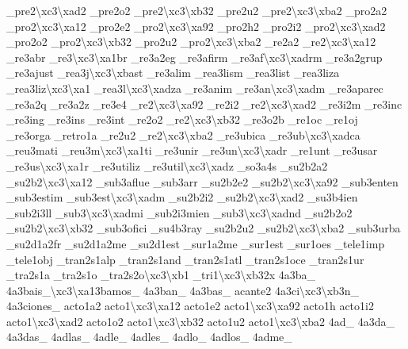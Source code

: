 {\-\_\-pre2\textbackslash{}xc3\textbackslash{}xad2 \-\_\-pre2o2 \-\_\-pre2\textbackslash{}xc3\textbackslash{}xb32 \-\_\-pre2u2 \-\_\-pre2\textbackslash{}xc3\textbackslash{}xba2 \-\_\-pro2a2 \-\_\-pro2\textbackslash{}xc3\textbackslash{}xa12 \-\_\-pro2e2 \-\_\-pro2\textbackslash{}xc3\textbackslash{}xa92 \-\_\-pro2h2 \-\_\-pro2i2 \-\_\-pro2\textbackslash{}xc3\textbackslash{}xad2 \-\_\-pro2o2 \-\_\-pro2\textbackslash{}xc3\textbackslash{}xb32 \-\_\-pro2u2 \-\_\-pro2\textbackslash{}xc3\textbackslash{}xba2 \-\_\-re2a2 \-\_\-re2\textbackslash{}xc3\textbackslash{}xa12 \-\_\-re3abr \-\_\-re3\textbackslash{}xc3\textbackslash{}xa1br \-\_\-re3a2eg \-\_\-re3afirm \-\_\-re3af\textbackslash{}xc3\textbackslash{}xadrm \-\_\-re3a2grup \-\_\-re3ajust \-\_\-rea3j\textbackslash{}xc3\textbackslash{}xbast \-\_\-re3alim \-\_\-rea3lism \-\_\-rea3list \-\_\-rea3liza \-\_\-rea3liz\textbackslash{}xc3\textbackslash{}xa1 \-\_\-rea3l\textbackslash{}xc3\textbackslash{}xadza \-\_\-re3anim \-\_\-re3an\textbackslash{}xc3\textbackslash{}xadm \-\_\-re3aparec \-\_\-re3a2q \-\_\-re3a2z \-\_\-re3e4 \-\_\-re2\textbackslash{}xc3\textbackslash{}xa92 \-\_\-re2i2 \-\_\-re2\textbackslash{}xc3\textbackslash{}xad2 \-\_\-re3i2m \-\_\-re3inc \-\_\-re3ing \-\_\-re3ins \-\_\-re3int \-\_\-re2o2 \-\_\-re2\textbackslash{}xc3\textbackslash{}xb32 \-\_\-re3o2b \-\_\-re1oc \-\_\-re1oj \-\_\-re3orga \-\_\-retro1a \-\_\-re2u2 \-\_\-re2\textbackslash{}xc3\textbackslash{}xba2 \-\_\-re3ubica \-\_\-re3ub\textbackslash{}xc3\textbackslash{}xadca \-\_\-reu3mati \-\_\-reu3m\textbackslash{}xc3\textbackslash{}xa1ti \-\_\-re3unir \-\_\-re3un\textbackslash{}xc3\textbackslash{}xadr \-\_\-re1unt \-\_\-re3usar \-\_\-re3us\textbackslash{}xc3\textbackslash{}xa1r \-\_\-re3utiliz \-\_\-re3util\textbackslash{}xc3\textbackslash{}xadz \-\_\-so3a4s \-\_\-su2b2a2 \-\_\-su2b2\textbackslash{}xc3\textbackslash{}xa12 \-\_\-sub3aflue \-\_\-sub3arr \-\_\-su2b2e2 \-\_\-su2b2\textbackslash{}xc3\textbackslash{}xa92 \-\_\-sub3enten \-\_\-sub3estim \-\_\-sub3est\textbackslash{}xc3\textbackslash{}xadm \-\_\-su2b2i2 \-\_\-su2b2\textbackslash{}xc3\textbackslash{}xad2 \-\_\-su3b4ien \-\_\-sub2i3ll \-\_\-sub3\textbackslash{}xc3\textbackslash{}xadmi \-\_\-sub2i3mien \-\_\-sub3\textbackslash{}xc3\textbackslash{}xadnd \-\_\-su2b2o2 \-\_\-su2b2\textbackslash{}xc3\textbackslash{}xb32 \-\_\-sub3ofici \-\_\-su4b3ray \-\_\-su2b2u2 \-\_\-su2b2\textbackslash{}xc3\textbackslash{}xba2 \-\_\-sub3urba \-\_\-su2d1a2fr \-\_\-su2d1a2me \-\_\-su2d1est \-\_\-sur1a2me \-\_\-sur1est \-\_\-sur1oes \-\_\-tele1imp \-\_\-tele1obj \-\_\-tran2s1alp \-\_\-tran2s1and \-\_\-tran2s1atl \-\_\-tran2s1oce \-\_\-tran2s1ur \-\_\-tra2s1a \-\_\-tra2s1o \-\_\-tra2s2o\textbackslash{}xc3\textbackslash{}xb1 \-\_\-tri1\textbackslash{}xc3\textbackslash{}xb32x 4a3ba\-\_\- 4a3bais\-\_\textbackslash{}xc3\textbackslash{}xa13bamos\-\_\- 4a3ban\-\_\- 4a3bas\-\_\- acante2 4a3ci\textbackslash{}xc3\textbackslash{}xb3n\-\_\- 4a3ciones\-\_\- acto1a2 acto1\textbackslash{}xc3\textbackslash{}xa12 acto1e2 acto1\textbackslash{}xc3\textbackslash{}xa92 acto1h acto1i2 acto1\textbackslash{}xc3\textbackslash{}xad2 acto1o2 acto1\textbackslash{}xc3\textbackslash{}xb32 acto1u2 acto1\textbackslash{}xc3\textbackslash{}xba2 4ad\-\_\- 4a3da\-\_\- 4a3das\-\_\- 4adlas\-\_\- 4adle\-\_\- 4adles\-\_\- 4adlo\-\_\- 4adlos\-\_\- 4adme\-\_\- }
